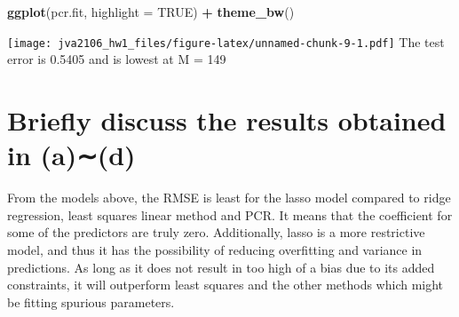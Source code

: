 \documentclass[]{article}
\newenvironment{Shaded}{\begin{snugshade}}{\end{snugshade}}
\newcommand{\KeywordTok}[1]{\textcolor[rgb]{0.13,0.29,0.53}{\textbf{#1}}}
\newcommand{\DataTypeTok}[1]{\textcolor[rgb]{0.13,0.29,0.53}{#1}}
\newcommand{\StringTok}[1]{\textcolor[rgb]{0.31,0.60,0.02}{#1}}
\newcommand{\OtherTok}[1]{\textcolor[rgb]{0.56,0.35,0.01}{#1}}
\newcommand{\OperatorTok}[1]{\textcolor[rgb]{0.81,0.36,0.00}{\textbf{#1}}}
\newcommand{\NormalTok}[1]{#1}
\begin{document}
\begin{Shaded}
\begin{Highlighting}[]
\KeywordTok{ggplot}\NormalTok{(pcr.fit, }\DataTypeTok{highlight =} \OtherTok{TRUE}\NormalTok{) }\OperatorTok{+}\StringTok{ }\KeywordTok{theme_bw}\NormalTok{()}
\end{Highlighting}
\end{Shaded}

\texttt{[image: jva2106\_hw1\_files/figure-latex/unnamed-chunk-9-1.pdf]}
The test error is 0.5405 and is lowest at M = 149

\section{Brieﬂy discuss the results obtained in
(a)∼(d)}\label{briey-discuss-the-results-obtained-in-ad}

From the models above, the RMSE is least for the lasso model compared to
ridge regression, least squares linear method and PCR. It means that the
coefficient for some of the predictors are truly zero. Additionally,
lasso is a more restrictive model, and thus it has the possibility of
reducing overfitting and variance in predictions. As long as it does not
result in too high of a bias due to its added constraints, it will
outperform least squares and the other methods which might be fitting
spurious parameters.
\end{document}
